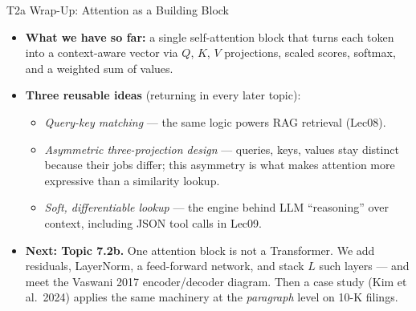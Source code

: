\begin{frame}{T2a Wrap-Up: Attention as a Building Block}
\begin{itemize}
\item \textbf{What we have so far:} a single self-attention block that turns each token into a context-aware vector via $Q$, $K$, $V$ projections, scaled scores, softmax, and a weighted sum of values.

\medskip
\item \textbf{Three reusable ideas} (returning in every later topic):
\begin{itemize}
    \item \emph{Query-key matching} --- the same logic powers RAG retrieval (Lec08).
    \item \emph{Asymmetric three-projection design} --- queries, keys, values stay distinct because their jobs differ; this asymmetry is what makes attention more expressive than a similarity lookup.
    \item \emph{Soft, differentiable lookup} --- the engine behind LLM ``reasoning'' over context, including JSON tool calls in Lec09.
\end{itemize}

\medskip
\item \textbf{Next: Topic 7.2b.} One attention block is not a Transformer. We add residuals, LayerNorm, a feed-forward network, and stack $L$ such layers --- and meet the Vaswani 2017 encoder/decoder diagram. Then a case study (Kim et al.\ 2024) applies the same machinery at the \emph{paragraph} level on 10-K filings.
\end{itemize}
\end{frame}



